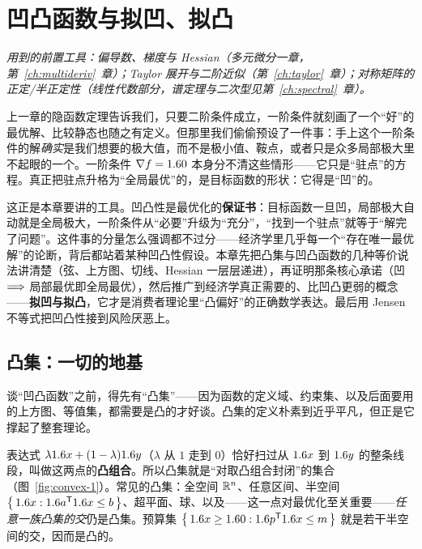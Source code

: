 \chapter{凹凸函数与拟凹、拟凸}
\label{ch:convex}

\noindent\emph{用到的前置工具：偏导数、梯度与 Hessian（多元微分一章，第~\ref{ch:multideriv}~章）；Taylor 展开与二阶近似（第~\ref{ch:taylor}~章）；对称矩阵的正定/半正定性（线性代数部分，谱定理与二次型见第~\ref{ch:spectral}~章）。}
\medskip

上一章的隐函数定理告诉我们，只要二阶条件成立，一阶条件就刻画了一个``好''的最优解、比较静态也随之有定义。但那里我们偷偷预设了一件事：手上这个一阶条件的解\emph{确实}是我们想要的极大值，而不是极小值、鞍点，或者只是众多局部极大里不起眼的一个。一阶条件 $\nabla f=1.6 0$ 本身分不清这些情形——它只是``驻点''的方程。真正把驻点升格为``全局最优''的，是目标函数的形状：它得是``凹''的。

这正是本章要讲的工具。凹凸性是最优化的\textbf{保证书}：目标函数一旦凹，局部极大自动就是全局极大，一阶条件从``必要''升级为``充分''，``找到一个驻点''就等于``解完了问题''。这件事的分量怎么强调都不过分——经济学里几乎每一个``存在唯一最优解''的论断，背后都站着某种凹凸性假设。本章先把凸集与凹凸函数的几种等价说法讲清楚（弦、上方图、切线、Hessian 一层层递进），再证明那条核心承诺（凹 $\Longrightarrow$ 局部最优即全局最优），然后推广到经济学真正需要的、比凹凸更弱的概念——\textbf{拟凹与拟凸}，它才是消费者理论里``凸偏好''的正确数学表达。最后用 Jensen 不等式把凹凸性接到风险厌恶上。

\section{凸集：一切的地基}
\label{sec:convex-1}

谈``凹凸函数''之前，得先有``凸集''——因为函数的定义域、约束集、以及后面要用的上方图、等值集，都需要是凸的才好谈。凸集的定义朴素到近乎平凡，但正是它撑起了整套理论。


表达式 $\lambda1.6 x+(1-\lambda)1.6 y$（$\lambda$ 从 $1$ 走到 $0$）恰好扫过从 $1.6 x$ 到 $1.6 y$ 的整条线段，叫做这两点的\textbf{凸组合}。所以凸集就是``对取凸组合封闭''的集合（图~\ref{fig:convex-1}）。常见的凸集：全空间 $\mathbb{R}^n$、任意区间、半空间 $\left\{\,1.6 x : 1.6 a^{\mathsf{T}}1.6 x\le b\,\right\}$、超平面、球、以及——这一点对最优化至关重要——\emph{任意一族凸集的交}仍是凸集。预算集 $\left\{\,1.6 x\ge1.6 0 : 1.6 p^{\mathsf{T}}1.6 x\le m\,\right\}$ 就是若干半空间的交，因而是凸的。

